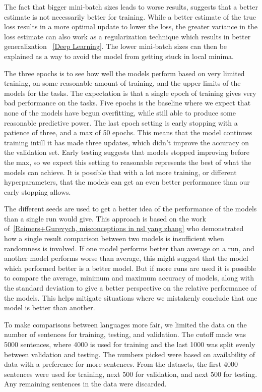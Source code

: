 The fact that bigger mini-batch sizes leads to worse results, suggests that a
better estimate is not necessarily better for training. While a better estimate
of the true loss results in a more optimal update to lower the loss, the greater
variance in the loss estimate can also work as a regularization technique which
results in better generalization ~\ref{Deep Learning}. The lower mini-batch
sizes can then be explained as a way to avoid the model from getting stuck in
local minima.

The three epochs is to see how well the models perform based on very limited
training, on some reasonable amount of training, and the upper limits of the
models for the tasks. The expectation is that a single epoch of training gives
very bad performance on the tasks. Five epochs is the baseline where we expect
that none of the models have begun overfitting, while still able to produce some
reasonable predictive power. The last epoch setting is early stopping with a
patience of three, and a max of 50 epochs. This means that the model continues
training intill it has made three updates, which didn't improve the accuracy on
the validation set. Early testing suggests that models stopped improving before
the max, so we expect this setting to reasonable represents the best of what the
models can achieve. It is possible that with a lot more training, or different
hyperparameters, that the models can get an even better performance than our
early stopping allows.

The different seeds are used to get a better idea of the performance of the
models than a single run would give. This approach is based on the work
of~\ref{Reimers+Gurevych, misconceptions in nsl yang zhang} who demonstrated how
a single result comparison between two models is insufficient when randomness is
involved. If one model performs better than average on a run, and another model
performs worse than average, this might suggest that the model which performed
better is a better model. But if more runs are used it is possible to compare
the average, minimum and maximum accuracy of models, along with the standard
deviation to give a better perspective on the relative performance of the
models. This helps mitigate situations where we mistakenly conclude that one
model is better than another.

To make comparisons between languages more fair, we limited the data on the
number of sentences for training, testing, and validation. The cutoff made was
5000 sentences, where 4000 is used for training and the last 1000 was split
evenly between validation and testing. The numbers picked were based on
availability of data with a preference for more sentences. From the datasets,
the first 4000 sentences were used for training, next 500 for validation, and
next 500 for testing. Any remaining sentences in the data were discarded.

